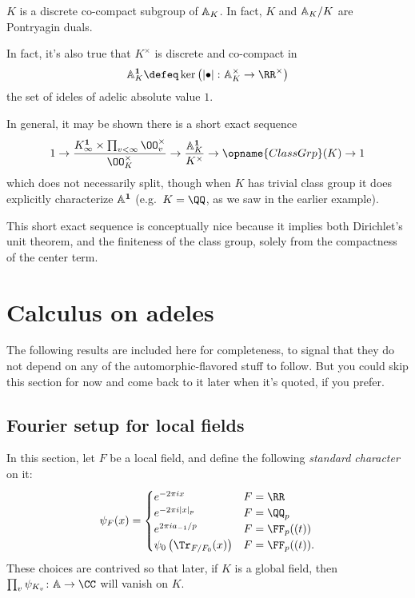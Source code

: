 \begin{theorem}
  $K$ is a discrete co-compact subgroup of $\AA_K$.
  In fact, $K$ and $\AA_K/K$ are Pontryagin duals.
\end{theorem}

\begin{remark*}
In fact, it's also true that $K^\times$
is discrete and co-compact in
\[ \AA_K^{\mathbf 1} \defeq
  \ker \left(
    \left\lvert \bullet \right\rvert \colon
    \AA_K^\times \to \RR^\times
  \right) \]
the set of ideles of adelic absolute value $1$.

In general, it may be shown
there is a short exact sequence
\[
  1 \to \frac{K_\infty^{\mathbf 1} \times
    \prod_{v < \infty} \OO_v^\times}{\OO_K^\times}
    \to \frac{\AA_K^{\mathbf 1}}{K^\times}
    \to \opname{ClassGrp}(K) \to 1
\]
which does not necessarily split,
though when $K$ has trivial class group
it does explicitly characterize $\AA^{\mathbf 1}$
(e.g.\ $K=\QQ$, as we saw in the earlier example).

This short exact sequence is conceptually nice because
it implies both Dirichlet's unit theorem,
and the finiteness of the class group,
solely from the compactness of the center term.
\end{remark*}

\section{Calculus on adeles}
The following results are included here for completeness,
to signal that they do not depend on any of the
automorphic-flavored stuff to follow.
But you could skip this section for now
and come back to it later when it's quoted, if you prefer.

\subsection{Fourier setup for local fields}
In this section, let $F$ be a local field,
and define the following \emph{standard character} on it:
\[
  \psi_F(x)
  = \begin{cases}
    e^{-2\pi i x} & F = \RR \\
    e^{-2\pi i |x|_p} & F = \QQ_p \\
    e^{2\pi i a_{-1} /p} & F = \FF_p( (t) ) \\
    \psi_0\left( \Tr_{F/F_0}(x) \right) & F = \FF_p( (t) ).
  \end{cases}
\]
These choices are contrived so that later,
if $K$ is a global field, then
$\prod_v \psi_{K_v} \colon \AA \to \CC$ will vanish on $K$.

